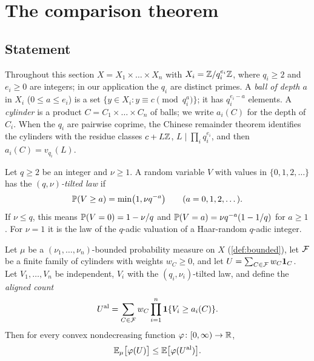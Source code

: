 \section{The comparison theorem}\label{sec:comparison}

\subsection{Statement}\label{sec:comparison-statement}

Throughout this section $X=X_1\times\dots\times X_n$ with $X_i=\Z/q_i^{e_i}\Z$, where $q_i\ge2$ and $e_i\ge0$ are
integers; in our application the $q_i$ are distinct primes. A \emph{ball of depth $a$} in $X_i$
($0\le a\le e_i$) is a set $\{y\in X_i: y\equiv c\pmod{q_i^{a}}\}$; it has $q_i^{e_i-a}$ elements. A
\emph{cylinder} is a product $C=C_1\times\dots\times C_n$ of balls; we write $a_i(C)$ for the depth of $C_i$. When
the $q_i$ are pairwise coprime, the Chinese remainder theorem identifies the cylinders with the residue classes
$c+L\Z$, $L\mid\prod_iq_i^{e_i}$, and then $a_i(C)=v_{q_i}(L)$.

\begin{definition}\label{def:tilted}
Let $q\ge2$ be an integer and $\nu\ge1$. A random variable $V$ with values in $\{0,1,2,\dots\}$ has the
\emph{$(q,\nu)$-tilted law} if
\[
  \P(V\ge a)=\min\bigl(1,\nu q^{-a}\bigr)\qquad(a=0,1,2,\dots).
\]
If $\nu\le q$, this means $\P(V=0)=1-\nu/q$ and $\P(V=a)=\nu q^{-a}(1-1/q)$ for $a\ge1$. For $\nu=1$ it is the
law of the $q$-adic valuation of a Haar-random $q$-adic integer.
\end{definition}

\begin{theorem}\label{thm:comparison}
Let $\mu$ be a $(\nu_1,\dots,\nu_n)$-bounded probability measure on $X$ (\cref{def:bounded}), let $\cF$ be a finite
family of cylinders with weights $w_C\ge0$, and let $U=\sum_{C\in\cF}w_C\one_C$. Let $V_1,\dots,V_n$ be
independent, $V_i$ with the $(q_i,\nu_i)$-tilted law, and define the \emph{aligned count}
\[
  U^{\mathrm{al}}=\sum_{C\in\cF}w_C\prod_{i=1}^n\one\{V_i\ge a_i(C)\}.
\]
Then for every convex nondecreasing function $\varphi\colon[0,\infty)\to\R$,
\[
  \E_\mu\bigl[\varphi(U)\bigr]\le\E\bigl[\varphi(U^{\mathrm{al}})\bigr].
\]
\end{theorem}

